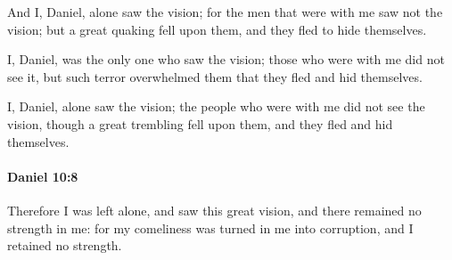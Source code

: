 			\begin{versebox}
					\item[BHS] 
					\item[LXX] 
					\item[ASV] And I, Daniel, alone saw the vision; for the men that were with me saw not the vision; but a great quaking fell upon them, and they fled to hide themselves.
					\item[NIV] I, Daniel, was the only one who saw the vision; those who were with me did not see it, but such terror overwhelmed them that they fled and hid themselves.
					\item[NRSV] I, Daniel, alone saw the vision; the people who were with me did not see the vision, though a great trembling fell upon them, and they fled and hid themselves.
			\end{versebox}

		\paragraph{Daniel 10:8} %
			\label{DANIEL-10-8}

			Therefore I was left alone, and saw this great vision, and there remained no strength in me: for my comeliness was turned in me into corruption, and I retained no strength.


